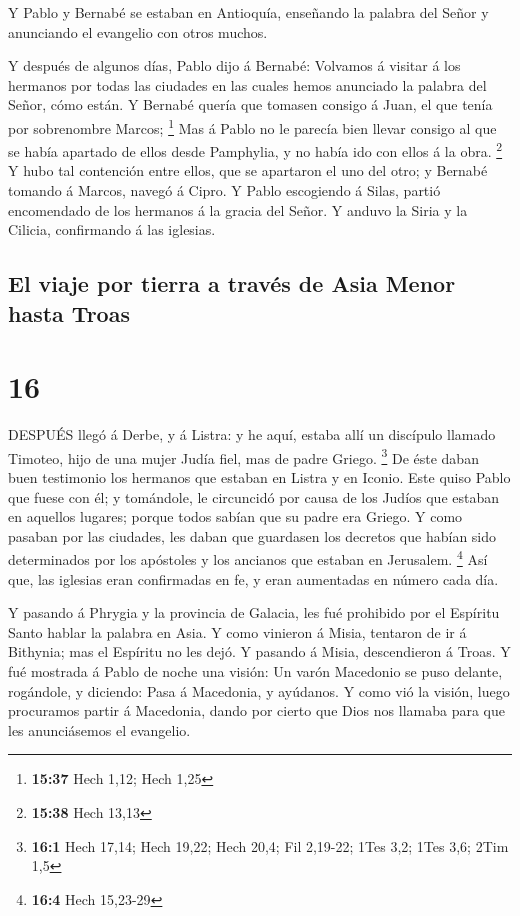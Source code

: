  Y Pablo y Bernabé se estaban en Antioquía, enseñando la
palabra del Señor y anunciando el evangelio con otros muchos.

 Y después de algunos días, Pablo dijo á Bernabé: Volvamos
á visitar á los hermanos por todas las ciudades en las cuales hemos
anunciado la palabra del Señor, cómo están.  Y Bernabé
quería que tomasen consigo á Juan, el que tenía por sobrenombre Marcos;
\footnote{\textbf{15:37} Hech 1,12; Hech 1,25}  Mas á Pablo
no le parecía bien llevar consigo al que se había apartado de ellos
desde Pamphylia, y no había ido con ellos á la obra. \footnote{\textbf{15:38}
  Hech 13,13}  Y hubo tal contención entre ellos, que se
apartaron el uno del otro; y Bernabé tomando á Marcos, navegó á Cipro.
 Y Pablo escogiendo á Silas, partió encomendado de los
hermanos á la gracia del Señor.  Y anduvo la Siria y la
Cilicia, confirmando á las iglesias.

\hypertarget{el-viaje-por-tierra-a-travuxe9s-de-asia-menor-hasta-troas}{%
\subsection{El viaje por tierra a través de Asia Menor hasta
Troas}\label{el-viaje-por-tierra-a-travuxe9s-de-asia-menor-hasta-troas}}

\hypertarget{section-15}{%
\section{16}\label{section-15}}

 DESPUÉS llegó á Derbe, y á Listra: y he aquí, estaba allí
un discípulo llamado Timoteo, hijo de una mujer Judía fiel, mas de padre
Griego. \footnote{\textbf{16:1} Hech 17,14; Hech 19,22; Hech 20,4; Fil
  2,19-22; 1Tes 3,2; 1Tes 3,6; 2Tim 1,5}  De éste daban buen
testimonio los hermanos que estaban en Listra y en Iconio. 
Este quiso Pablo que fuese con él; y tomándole, le circuncidó por causa
de los Judíos que estaban en aquellos lugares; porque todos sabían que
su padre era Griego.  Y como pasaban por las ciudades, les
daban que guardasen los decretos que habían sido determinados por los
apóstoles y los ancianos que estaban en Jerusalem. \footnote{\textbf{16:4}
  Hech 15,23-29}  Así que, las iglesias eran confirmadas en
fe, y eran aumentadas en número cada día.

 Y pasando á Phrygia y la provincia de Galacia, les fué
prohibido por el Espíritu Santo hablar la palabra en Asia. 
Y como vinieron á Misia, tentaron de ir á Bithynia; mas el Espíritu no
les dejó.  Y pasando á Misia, descendieron á Troas.
 Y fué mostrada á Pablo de noche una visión: Un varón
Macedonio se puso delante, rogándole, y diciendo: Pasa á Macedonia, y
ayúdanos.  Y como vió la visión, luego procuramos partir á
Macedonia, dando por cierto que Dios nos llamaba para que les
anunciásemos el evangelio.

